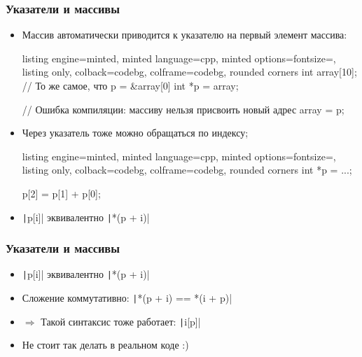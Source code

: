 \documentclass[10pt]{beamer}
\begin{document}
\begin{frame}[fragile]
\frametitle{Указатели и массивы}
\begin{itemize}
\item Массив автоматически приводится к указателю на первый элемент массива:
\begin{tcblisting}{listing engine=minted, minted language=cpp, minted options={fontsize=\scriptsize}, listing only, colback=codebg, colframe=codebg, rounded corners}
int array[10];
// То же самое, что p = &array[0]
int *p = array;

// Ошибка компиляции: массиву нельзя присвоить новый адрес
array = p;
\end{tcblisting}
\pause
\item Через указатель тоже можно обращаться по индексу;
\begin{tcblisting}{listing engine=minted, minted language=cpp, minted options={fontsize=\scriptsize}, listing only, colback=codebg, colframe=codebg, rounded corners}
int *p = ...;

p[2] = p[1] + p[0];
\end{tcblisting}
\pause
{}
\item \texttt|p[i]| эквивалентно \texttt|*(p + i)|
\end{itemize}
\end{frame}

\begin{frame}[fragile]
\frametitle{Указатели и массивы}
\begin{itemize}
\item \texttt|p[i]| эквивалентно \texttt|*(p + i)|
\pause
\item Сложение коммутативно: \texttt|*(p + i) == *(i + p)|
\pause
\item \(\Longrightarrow\) Такой синтаксис тоже работает: \texttt|i[p]|
\pause
\item Не стоит так делать в реальном коде :)
\end{itemize}
\end{frame}
\end{document}

